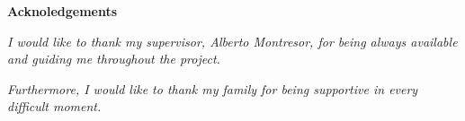 \thispagestyle{empty}

\begin{center}
  {\bf \Huge Acknoledgements}
\end{center}

\vspace{4cm}


\emph{
  I would like to thank my supervisor, Alberto Montresor, for being always available and guiding me throughout the project.}
  
\emph{
Furthermore, I would like to thank my family for being supportive in every difficult moment.
}
